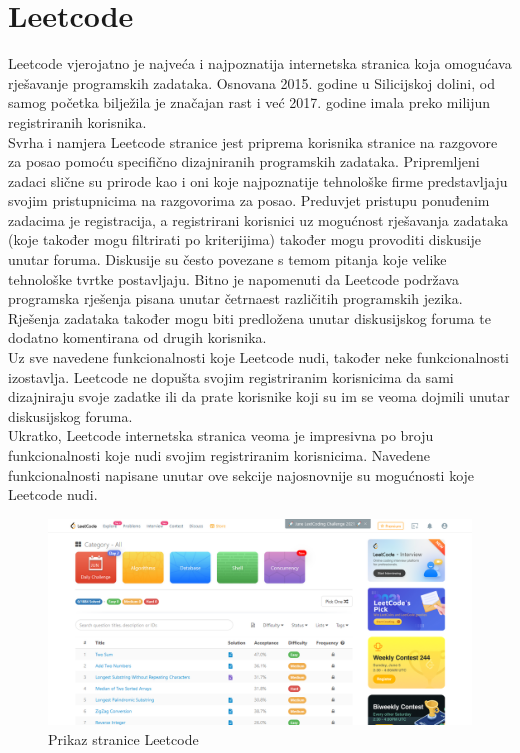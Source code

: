 \documentclass[times, utf8, zavrsni]{fer}
\begin{document}
	\section{Leetcode}
	Leetcode vjerojatno je najveća i najpoznatija internetska stranica koja omogućava rješavanje programskih zadataka. Osnovana 2015. godine u Silicijskoj dolini, od samog početka bilježila je značajan rast i već 2017. godine imala preko milijun registriranih korisnika.\\
	Svrha i namjera Leetcode stranice jest priprema korisnika stranice na razgovore za posao pomoću specifično dizajniranih programskih zadataka. Pripremljeni zadaci slične su prirode kao i oni koje najpoznatije tehnološke firme predstavljaju svojim pristupnicima na razgovorima za posao. Preduvjet pristupu ponuđenim zadacima je registracija, a registrirani korisnici uz mogućnost rješavanja zadataka (koje također mogu filtrirati po kriterijima) također mogu provoditi diskusije unutar foruma. Diskusije su često povezane s temom pitanja koje velike tehnološke tvrtke postavljaju. Bitno je napomenuti da Leetcode podržava programska rješenja pisana unutar četrnaest različitih programskih jezika. Rješenja zadataka također mogu biti predložena unutar diskusijskog foruma te dodatno komentirana od drugih korisnika.\\
	Uz sve navedene funkcionalnosti koje Leetcode nudi, također neke funkcionalnosti izostavlja. Leetcode ne dopušta svojim registriranim korisnicima da sami dizajniraju svoje zadatke ili da prate korisnike koji su im se veoma dojmili unutar diskusijskog foruma.\\
	Ukratko, Leetcode internetska stranica veoma je impresivna po broju funkcionalnosti koje nudi svojim registriranim korisnicima. Navedene funkcionalnosti napisane unutar ove sekcije najosnovnije su mogućnosti koje Leetcode nudi.
	\begin{figure}[H]
		\centering
		\includegraphics[width=\linewidth]{pictures/prikazi/Leetcode.png}
		\caption{Prikaz stranice Leetcode}
		\label{fig:leetcode}
	\end{figure}
\end{document}
